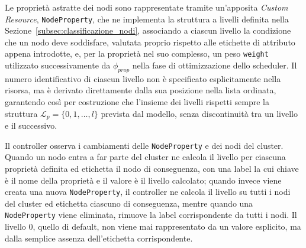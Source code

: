 Le proprietà astratte dei nodi sono rappresentate tramite un'apposita \emph{Custom Resource}, \texttt{NodeProperty}, che ne implementa la struttura a livelli definita nella Sezione~\ref{subsec:classificazione_nodi}, associando a ciascun livello la condizione che un nodo deve soddisfare, valutata proprio rispetto alle etichette di attributo appena introdotte, e, per la proprietà nel suo complesso, un peso \texttt{weight} utilizzato successivamente da $\phi_{prop}$ nella fase di ottimizzazione dello scheduler. Il numero identificativo di ciascun livello non è specificato esplicitamente nella risorsa, ma è derivato direttamente dalla sua posizione nella lista ordinata, garantendo così per costruzione che l'insieme dei livelli rispetti sempre la struttura $\mathcal{L}_p = \{0, 1, \ldots, l\}$ prevista dal modello, senza discontinuità tra un livello e il successivo.

Il controller osserva i cambiamenti delle \texttt{NodeProperty} e dei nodi del cluster. Quando un nodo entra a far parte del cluster ne calcola il livello per ciascuna proprietà definita ed etichetta il nodo di conseguenza, con una label la cui chiave è il nome della proprietà e il valore è il livello calcolato; quando invece viene creata una nuova \texttt{NodeProperty}, il controller ne calcola il livello su tutti i nodi del cluster ed etichetta ciascuno di conseguenza, mentre quando una \texttt{NodeProperty} viene eliminata, rimuove la label corrispondente da tutti i nodi. Il livello 0, quello di default, non viene mai rappresentato da un valore esplicito, ma dalla semplice assenza dell'etichetta corrispondente.

